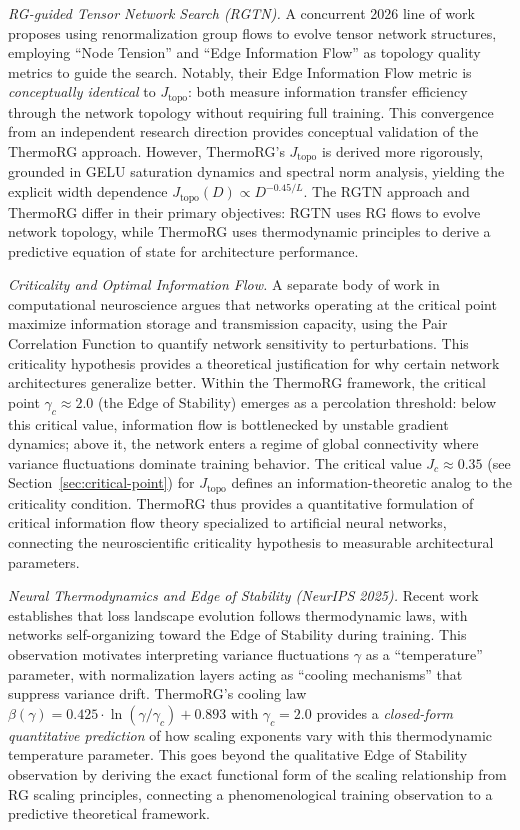 \documentclass[11pt, a4paper]{article}
\theoremstyle{plain}
\begin{document}
\medskip
\noindent\textit{RG-guided Tensor Network Search (RGTN).} \citep{rg-tn-2026} A concurrent 2026 line of work proposes using renormalization group flows to evolve tensor network structures, employing ``Node Tension'' and ``Edge Information Flow'' as topology quality metrics to guide the search. Notably, their Edge Information Flow metric is \emph{conceptually identical} to $J_{\mathrm{topo}}$: both measure information transfer efficiency through the network topology without requiring full training. This convergence from an independent research direction provides conceptual validation of the ThermoRG approach. However, ThermoRG's $J_{\mathrm{topo}}$ is derived more rigorously, grounded in GELU saturation dynamics and spectral norm analysis, yielding the explicit width dependence $J_{\mathrm{topo}}(D) \propto D^{-0.45/L}$. The RGTN approach and ThermoRG differ in their primary objectives: RGTN uses RG flows to evolve network topology, while ThermoRG uses thermodynamic principles to derive a predictive equation of state for architecture performance.

\medskip
\noindent\textit{Criticality and Optimal Information Flow.} \citep{criticality-neuroscience} A separate body of work in computational neuroscience argues that networks operating at the critical point maximize information storage and transmission capacity, using the Pair Correlation Function to quantify network sensitivity to perturbations. This criticality hypothesis provides a theoretical justification for why certain network architectures generalize better. Within the ThermoRG framework, the critical point $\gamma_c \approx 2.0$ (the Edge of Stability) emerges as a percolation threshold: below this critical value, information flow is bottlenecked by unstable gradient dynamics; above it, the network enters a regime of global connectivity where variance fluctuations dominate training behavior. The critical value $J_c \approx 0.35$ (see Section~\ref{sec:critical-point}) for $J_{\mathrm{topo}}$ defines an information-theoretic analog to the criticality condition. ThermoRG thus provides a quantitative formulation of critical information flow theory specialized to artificial neural networks, connecting the neuroscientific criticality hypothesis to measurable architectural parameters.

\medskip
\noindent\textit{Neural Thermodynamics and Edge of Stability (NeurIPS 2025).} \citep{edge-of-stability-2025} Recent work establishes that loss landscape evolution follows thermodynamic laws, with networks self-organizing toward the Edge of Stability during training. This observation motivates interpreting variance fluctuations $\gamma$ as a ``temperature'' parameter, with normalization layers acting as ``cooling mechanisms'' that suppress variance drift. ThermoRG's cooling law $\beta(\gamma) = 0.425 \cdot \ln(\gamma/\gamma_c) + 0.893$ with $\gamma_c = 2.0$ provides a \emph{closed-form quantitative prediction} of how scaling exponents vary with this thermodynamic temperature parameter. This goes beyond the qualitative Edge of Stability observation by deriving the exact functional form of the scaling relationship from RG scaling principles, connecting a phenomenological training observation to a predictive theoretical framework.
\end{document}

